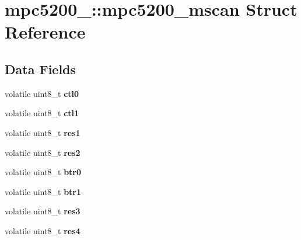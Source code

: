 \hypertarget{structmpc5200___1_1mpc5200__mscan}{}\section{mpc5200\+\_\+\+::mpc5200\+\_\+mscan Struct Reference}
\label{structmpc5200___1_1mpc5200__mscan}
\subsection*{Data Fields}
\begin{DoxyCompactItemize}
\item 
\mbox{\label{structmpc5200___1_1mpc5200__mscan_a3473a3664def882d804525808db60f5f}} 
volatile uint8\+\_\+t {\bfseries ctl0}
\item 
\mbox{\label{structmpc5200___1_1mpc5200__mscan_a5784bb86ba23f8cfe922a08fa044f5ee}} 
volatile uint8\+\_\+t {\bfseries ctl1}
\item 
\mbox{\label{structmpc5200___1_1mpc5200__mscan_af20d58ec894545a7dec93510d6356dea}} 
volatile uint8\+\_\+t {\bfseries res1}
\item 
\mbox{\label{structmpc5200___1_1mpc5200__mscan_aadeab9254e007191173da3b993c797d2}} 
volatile uint8\+\_\+t {\bfseries res2}
\item 
\mbox{\label{structmpc5200___1_1mpc5200__mscan_a9e013c3555fbb9ce2ae817263a28aea0}} 
volatile uint8\+\_\+t {\bfseries btr0}
\item 
\mbox{\label{structmpc5200___1_1mpc5200__mscan_ababa5aace6b44dcd8fd794f1d004f8aa}} 
volatile uint8\+\_\+t {\bfseries btr1}
\item 
\mbox{\label{structmpc5200___1_1mpc5200__mscan_acaf36da0eba38ead09c2a6e6fee64f8e}} 
volatile uint8\+\_\+t {\bfseries res3}
\item 
\mbox{\label{structmpc5200___1_1mpc5200__mscan_a0a99e5e4a05972f068c2230e4a99caca}} 
volatile uint8\+\_\+t {\bfseries res4}

\end{DoxyCompactItemize}
